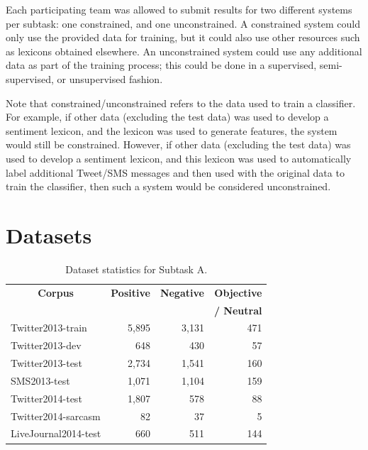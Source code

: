 \documentclass[11pt]{article}
\begin{document}
Each participating team was allowed to submit results for two different systems per subtask: one constrained, and one unconstrained.
A constrained system could only use the provided data for training, but it could also use other resources such as lexicons obtained elsewhere.
An unconstrained system could use any additional data as part of the training process;
this could be done in a supervised, semi-supervised, or unsupervised fashion.

Note that constrained/unconstrained refers to the data used to train a classifier. For example, if other data (excluding the test data) was used to develop a sentiment lexicon, and the lexicon was used to generate features, the system would still be constrained. However, if other data (excluding the test data) was used to develop a sentiment lexicon, and this lexicon was used to automatically label additional Tweet/SMS messages and then used with the original data to train the classifier, then such a system would be considered unconstrained.


\section{Datasets}

 \begin{table}[ht]
\small
\begin{center}
\begin{tabular}{|l |r |r | r |}
\hline
\multicolumn{1}{|c|}{\bf Corpus} & \bf Positive & \bf Negative & \bf Objective \\
&  &  & \bf / Neutral \\
\hline
Twitter2013-train  & 5,895 & 3,131 &  471  \\
Twitter2013-dev  & 648 & 430 &  57    \\
Twitter2013-test  & 2,734 & 1,541 & 160  \\
SMS2013-test  & 1,071 & 1,104 & 159 \\
\hline
Twitter2014-test  & 1,807 & 578 & 88 \\
Twitter2014-sarcasm & 82 & 37 & 5 \\
LiveJournal2014-test  & 660 & 511 & 144 \\
\hline
\end{tabular}
\caption{Dataset statistics for Subtask A.}
\label{T:CorpusStatsA}
\end{center}
\end{table}
\end{document}
